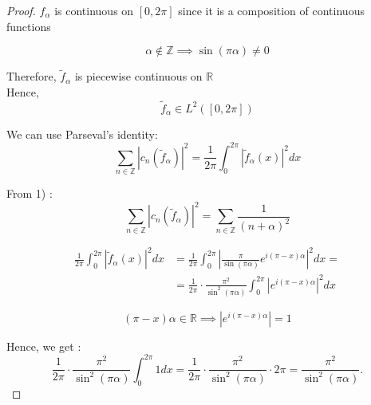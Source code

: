 \documentclass[11pt]{article}
\begin{document}
\begin{proof}
\noindent $f_\alpha$ is continuous on $[0,2\pi]$ since it is a composition of continuous functions

\[ \alpha \notin \mathbb{Z} \implies \sin(\pi\alpha) \neq 0 \]

\noindent Therefore, $\tilde{f}_\alpha$ is piecewise continuous on $\mathbb{R}$ \\
Hence, 
\[ \tilde{f}_\alpha \in L^2([0,2\pi]) \]

\noindent We can use Parseval's identity:
\[ \sum_{n \in \mathbb{Z}} |c_n(\tilde{f}_\alpha)|^2 = \frac{1}{2\pi} \int_0^{2\pi} |\tilde{f}_\alpha(x)|^2 dx \]

\noindent From 1) :
\[ \sum_{n \in \mathbb{Z}} |c_n(\tilde{f}_\alpha)|^2 = \sum_{n \in \mathbb{Z}} \frac{1}{(n+\alpha)^2} \]

\begin{align*}
\frac{1}{2\pi} \int_0^{2\pi} |\tilde{f}_\alpha(x)|^2 dx &= \frac{1}{2\pi} \int_0^{2\pi} \left| \frac{\pi}{\sin(\pi\alpha)} e^{i(\pi-x)\alpha} \right|^2 dx = \\[10pt]
&= \frac{1}{2\pi} \cdot \frac{\pi^2}{\sin^2(\pi\alpha)} \int_0^{2\pi} \left| e^{i(\pi-x)\alpha} \right|^2 dx
\end{align*}

\[ (\pi-x)\alpha \in \mathbb{R} \implies \left| e^{i(\pi-x)\alpha} \right| = 1 \]

\noindent Hence, we get :
\[ \frac{1}{2\pi} \cdot \frac{\pi^2}{\sin^2(\pi\alpha)} \int_0^{2\pi} 1 dx = \frac{1}{2\pi} \cdot \frac{\pi^2}{\sin^2(\pi\alpha)} \cdot 2\pi = \frac{\pi^2}{\sin^2(\pi\alpha)} .\]
\end{proof}
\end{document}
